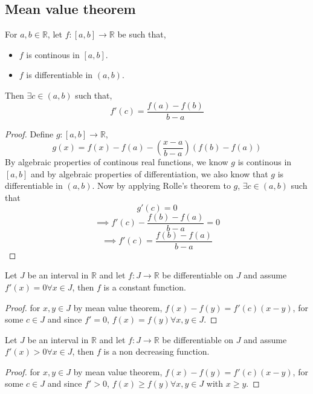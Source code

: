 \documentclass[11pt,a4paper]{colorart}
\def\l{\left}
\def\r{\right}
\def\R{\mathbb{R}}
\def\ra{\rightarrow}
\begin{document}
\subsection{Mean value theorem}

\begin{theorem}
	For $a,b \in \R$, let $f:[a,b] \ra \R$ be such that,
	\begin{itemize}
		\item $f$ is continous in $[a,b]$.
		\item $f$ is differentiable in $(a,b)$.
	\end{itemize}
	Then $\exists c \in (a,b)$ such that,
	\[ f'(c) = \frac{ f(a) - f(b) }{ b-a } \]
\end{theorem}

\begin{proof}
	Define $g:[a,b]\ra\R$,
	\[ g(x) = f(x) - f(a) - \l( \frac{ x-a }{ b-a } \r) ( f(b) - f(a) ) \]
	By algebraic properties of continous real functions, we know $g$ is continous in $[a,b]$ and by algebraic properties of differentiation, we also know that $g$ is differentiable in $(a,b)$. Now by applying Rolle's theorem to $g$, $\exists c \in (a,b)$ such that
	\[ g'(c) = 0 \]
	\[ \implies  f'(c) - \frac{ f(b)-f(a) }{ b-a } = 0 \]
	\[ \implies f'(c) = \frac{ f(b)-f(a) }{ b-a } \]
\end{proof}

\begin{example}
	Let $J$ be an interval in $\R$ and let $f:J\ra\R$ be differentiable on $J$ and assume $f'(x)=0 \forall x \in J$, then $f$ is a constant function.
\end{example}

\begin{proof}
	for $x,y\in J$ by mean value theorem, $f(x)-f(y)=f'(c)(x-y)$, for some $c\in J$ and since $f'=0$, $f(x) = f(y) \forall x,y \in J$.
\end{proof}

\begin{example}
	Let $J$ be an interval in $\R$ and let $f:J\ra\R$ be differentiable on $J$ and assume $f'(x)>0 \forall x \in J$, then $f$ is a non decreasing function.
\end{example}

\begin{proof}
	for $x,y\in J$ by mean value theorem, $f(x)-f(y)=f'(c)(x-y)$, for some $c\in J$ and since $f'>0$, $f(x) \geq f(y) \forall x,y \in J$ with $x\geq y$.
\end{proof}
\end{document}
